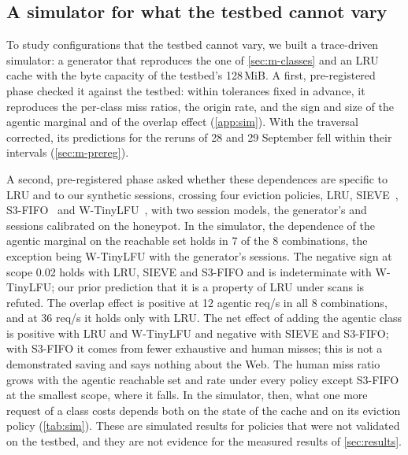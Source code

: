 \subsection{A simulator for what the testbed cannot vary}\label{sec:m-sim}
To study configurations that the testbed cannot vary, we built a trace-driven simulator:
a generator that reproduces the one of \cref{sec:m-classes} and an LRU cache with the
byte capacity of the testbed's 128\,MiB.
A first, pre-registered phase checked it against the testbed: within tolerances fixed in
advance, it reproduces the per-class miss ratios, the origin rate, and the sign and size
of the agentic marginal and of the overlap effect (\cref{app:sim}).
With the traversal corrected, its predictions for the reruns of 28 and 29 September fell
within their intervals (\cref{sec:m-prereg}).

A second, pre-registered phase asked whether these dependences are specific to LRU and to
our synthetic sessions, crossing four eviction policies, LRU, SIEVE~\cite{zhang2024sieve},
S3-FIFO~\cite{yang2023s3fifo} and W-TinyLFU~\cite{einziger2017tinylfu},
with two session models, the generator's and sessions calibrated on the
honeypot.
In the simulator, the dependence of the agentic marginal on the reachable set holds in 7 of
the 8 combinations, the exception being W-TinyLFU with the generator's
sessions.
The negative sign at scope 0.02 holds with LRU, SIEVE and S3-FIFO and is indeterminate with
W-TinyLFU; our prior prediction that it is a property of LRU under scans is
refuted.
The overlap effect is positive at 12 agentic req/s in all 8 combinations, and at 36 req/s it
holds only with LRU.
The net effect of adding the agentic class is positive with LRU and W-TinyLFU and negative
with SIEVE and S3-FIFO; with S3-FIFO it comes from fewer exhaustive and human misses; this is not a
demonstrated saving and says nothing about the Web.
The human miss ratio grows with the agentic reachable set and rate under every policy
except S3-FIFO at the smallest scope, where it falls.
In the simulator, then, what one more request of a class costs depends both on the state of
the cache and on its eviction policy (\cref{tab:sim}).
These are simulated results for policies that were not validated on the testbed, and they
are not evidence for the measured results of \cref{sec:results}.
